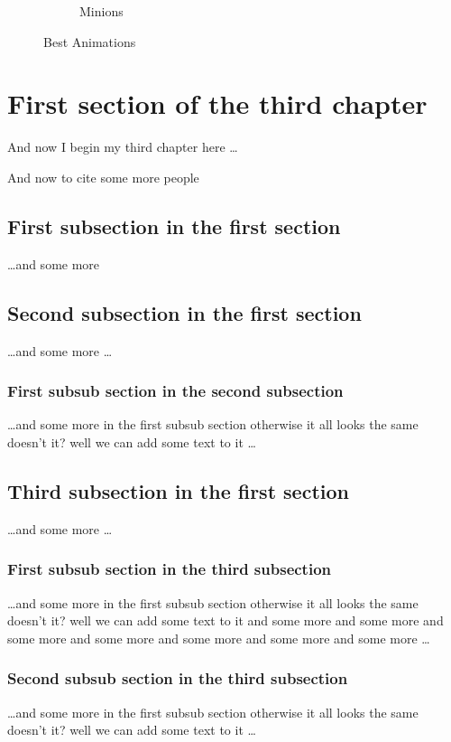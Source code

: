 \begin{landscape}
\begin{figure}
\begin{subfigure}[b]{0.3\textwidth}
			\caption{Minions}
			\label{fig:Minnion}
		\end{subfigure}
		\caption{Best Animations}
		\label{fig:animations}
	\end{figure}
	

\end{landscape}

\section{First section of the third chapter}
And now I begin my third chapter here \dots

And now to cite some more people~\citet{Rea85,Ancey1996}

\subsection{First subsection in the first section}
\dots and some more 

\subsection{Second subsection in the first section}
\dots and some more \dots

\subsubsection{First subsub section in the second subsection}
\dots and some more in the first subsub section otherwise it all looks the same
doesn't it? well we can add some text to it \dots

\subsection{Third subsection in the first section}
\dots and some more \dots

\subsubsection{First subsub section in the third subsection}
\dots and some more in the first subsub section otherwise it all looks the same
doesn't it? well we can add some text to it and some more and some more and
some more and some more and some more and some more and some more \dots

\subsubsection{Second subsub section in the third subsection}
\dots and some more in the first subsub section otherwise it all looks the same
doesn't it? well we can add some text to it \dots

